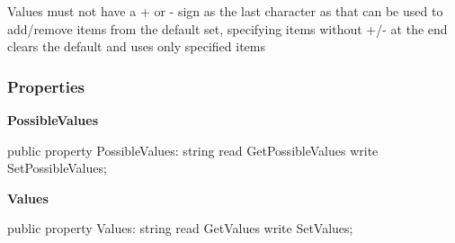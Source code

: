 \documentclass{report}
\newif\ifpdf
\begin{document}
 Values must not have a + or {-} sign as the last character as that can be used to add/remove items from the default set, specifying items without +/{-} at the end clears the default and uses only specified items\subsubsection*{\large{\textbf{Properties}}\normalsize\hspace{1ex}\hfill}
\begin{list}{}{
\setlength{\itemindent}{0cm}
\setlength{\listparindent}{0cm}
\setlength{\leftmargin}{\evensidemargin}
\addtolength{\leftmargin}{\tmplength}
\settowidth{\labelsep}{X}
\addtolength{\leftmargin}{\labelsep}
\setlength{\labelwidth}{\tmplength}
}
\label{PasDoc_OptionParser.TSetOption-PossibleValues}
\item[\textbf{PossibleValues}\hfill]
\ifpdf
\begin{flushleft}
\fi
\begin{ttfamily}
public property PossibleValues: string read GetPossibleValues write SetPossibleValues;\end{ttfamily}

\ifpdf
\end{flushleft}
\fi


\par  \label{PasDoc_OptionParser.TSetOption-Values}
\item[\textbf{Values}\hfill]
\ifpdf
\begin{flushleft}
\fi
\begin{ttfamily}
public property Values: string read GetValues write SetValues;\end{ttfamily}

\ifpdf
\end{flushleft}
\fi


\par  \end{list}
\end{document}

